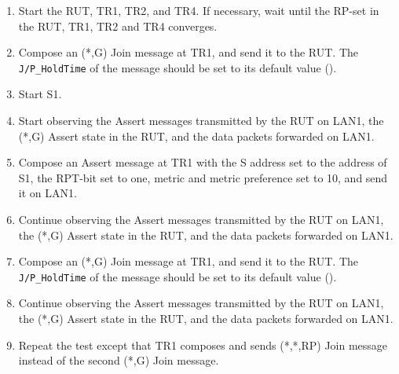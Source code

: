 \documentclass[11pt]{report}
\begin{document}
\begin{enumerate}

  \item Start the RUT, TR1, TR2, and TR4. If necessary, wait until the RP-set
  in the RUT, TR1, TR2 and TR4 converges.

  \item Compose an (*,G) Join message at TR1, and send it to the RUT.
  The \verb=J/P_HoldTime= of the message should be set to its default
  value ({\PimsmJPHoldTime}).

  \item Start S1.

  \item Start observing the Assert messages transmitted by the RUT on
  LAN1, the (*,G) Assert state in the RUT, and the data packets forwarded on
  LAN1. 

  \item Compose an Assert message at TR1 with the S address set to the
  address of S1, the RPT-bit set to one, metric and metric preference set to
  10, and send it on LAN1.

  \item Continue observing the Assert messages transmitted by the RUT on
  LAN1, the (*,G) Assert state in the RUT, and the data packets forwarded on
  LAN1.

  \item Compose an (*,G) Join message at TR1, and send it to the RUT.
  The \verb=J/P_HoldTime= of the message should be set to its default
  value ({\PimsmJPHoldTime}).

  \item Continue observing the Assert messages transmitted by the RUT on
  LAN1, the (*,G) Assert state in the RUT, and the data packets forwarded on
  LAN1.

  \item Repeat the test except that TR1 composes and sends (*,*,RP) Join
  message instead of the second (*,G) Join message.

\end{enumerate}

\end{document}
